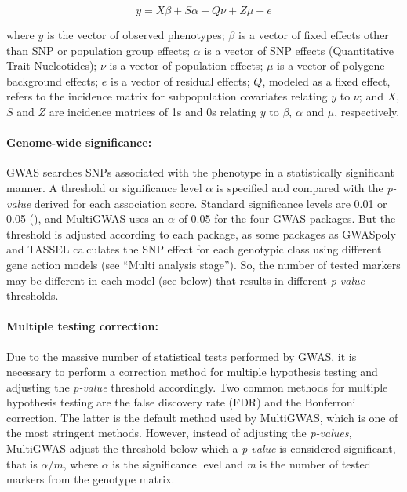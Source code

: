 \documentclass{article}
\begin{document}
\[
y=X\beta+S\alpha+Q\nu+Z\mu+e
\]

where $y$ is the vector of observed phenotypes; $\beta$ is a vector of fixed effects other than SNP or population group effects; $\alpha$ is a vector of SNP effects (Quantitative Trait Nucleotides); $\nu$ is a vector of population effects; $\mu$ is a vector of polygene background effects; $e$ is a vector of residual effects; $Q$, modeled as a fixed effect, refers to the incidence matrix for subpopulation covariates relating $y$ to $\nu$; and $X$, $S$ and $Z$ are incidence matrices of 1s and 0s relating $y$ to $\beta$, $\alpha$ and $\mu$, respectively.


\paragraph{Genome-wide significance: }

GWAS searches SNPs associated with the phenotype in a statistically significant manner. A threshold or significance level $\alpha$ is specified and compared with the \emph{p-value} derived for each association score. Standard significance levels are 0.01 or 0.05 (\cite{Gumpinger2018,Rosyara2016}), and MultiGWAS uses an $\alpha$ of 0.05 for the four GWAS packages. But the threshold is adjusted according to each package, as some packages as GWASpoly and TASSEL calculates the SNP effect for each genotypic class using different gene action models (see ``Multi analysis stage''). So, the number of tested markers\emph{ }may be different in each model (see below) that results in different \emph{p-value} thresholds.

\paragraph{Multiple testing correction:}

Due to the massive number of statistical tests performed by GWAS, it is necessary to perform a correction method for multiple hypothesis testing and adjusting the \emph{p-value} threshold accordingly. Two common methods for multiple hypothesis testing are the false discovery rate (FDR) and the Bonferroni correction. The latter is the default method used by MultiGWAS, which is one of the most stringent methods. However, instead of adjusting the \emph{p-values,} MultiGWAS adjust the threshold below which a \emph{p-value} is considered significant, that is $\alpha/m$, where $\alpha$ is the significance level and \emph{m }is the number of tested markers from the genotype matrix. 
\end{document}
